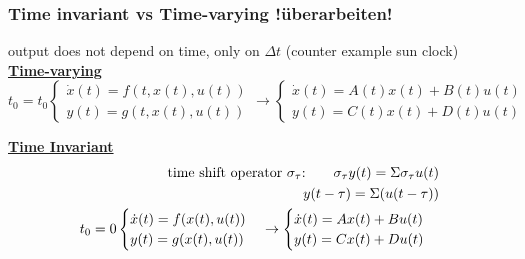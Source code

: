     \subsubsection*{Time invariant vs Time-varying !überarbeiten!}
        output does not depend on time, only on $\Delta t$ (counter example sun clock)\\
        {\centering\textbf{\underline{Time-varying}}}
        \begin{equation}
            t_0 = t_0
            \begin{cases}
                \dot{x}(t) = f(t, x(t), u(t))\\
                y(t) = g(t, x(t), u(t))
            \end{cases}
            \rightarrow
            \begin{cases}
                \dot{x}(t) = A(t)x(t) + B(t)u(t)\\
                y(t) = C(t)x(t) + D(t)u(t)
            \end{cases}
        \end{equation}

        {\centering\textbf{\underline{Time Invariant}}}
        \begin{align*}
            \text{time shift operator $\sigma_{\tau}$:\quad \quad} \sigma_{\tau} y(t) = \Sigma \sigma_{\tau} u(t)\\
            y(t - \tau) = \Sigma(u(t - \tau))\\
            t_0 = 0
            \begin{cases}
                \dot{x}(t) = f(x(t), u(t))\\
                y(t) = g(x(t), u(t))
            \end{cases}
            \rightarrow
            \begin{cases}
                \dot{x}(t) = Ax(t) + Bu(t)\\
                y(t) = Cx(t) + Du(t)
            \end{cases}
        \end{align*}